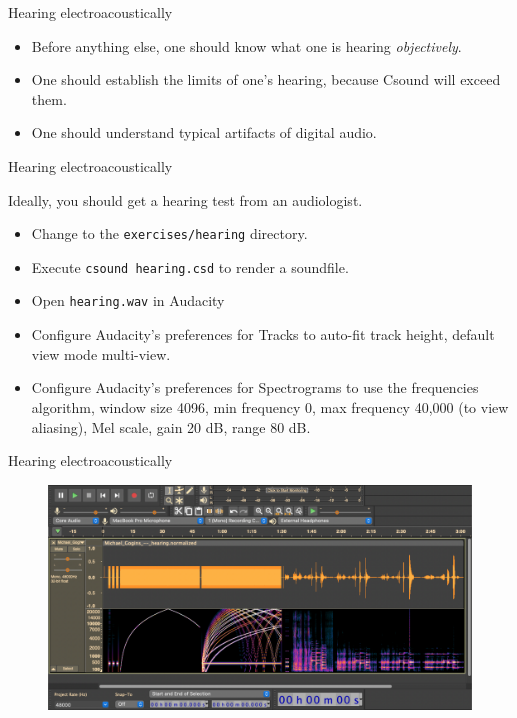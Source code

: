 \documentclass{beamer}
\begin{document}
\begin{frame}{Hearing electroacoustically}
\begin{itemize}
\item Before anything else, one should know what one is hearing \textit{objectively}.
\item One should establish the limits of one's hearing, because Csound will exceed them.
\item One should understand typical artifacts of digital audio.
\end{itemize}
\end{frame}

\begin{frame}{Hearing electroacoustically}
\begin{example}
Ideally, you should get a hearing test from an audiologist.
\begin{itemize}
\item Change to the \texttt{exercises/hearing} directory.
\item Execute \texttt{csound hearing.csd} to render a soundfile.
\item Open \texttt{hearing.wav} in Audacity
\item Configure Audacity's preferences for Tracks to auto-fit track height, default view mode multi-view.
\item Configure Audacity's preferences for Spectrograms to use the frequencies algorithm, window size 4096, min frequency 0, max frequency 40,000 (to view aliasing), Mel scale, gain 20 dB, range 80 dB.
\end{itemize}
\end{example}
\end{frame}

\begin{frame}{Hearing electroacoustically}
\begin{figure}
\centerline{\includegraphics[height = 0.66\textwidth]{hearing}}
\end{figure}
\end{frame}
\end{document}
